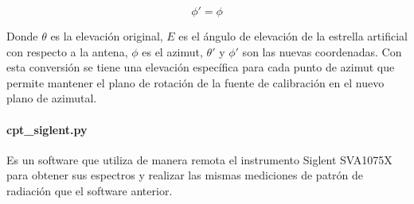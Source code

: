 \begin{equation}
    \phi' = \phi
\end{equation}

Donde $\theta$ es la elevación original, $E$ es el ángulo de elevación de la estrella artificial con respecto a la antena, $\phi$ es el azimut, $\theta'$ y $\phi'$ son las nuevas coordenadas. Con esta conversión se tiene una elevación específica para cada punto de azimut que permite mantener el plano de rotación de la fuente de calibración en el nuevo plano de azimutal.\\

\paragraph{cpt\_siglent.py} Es un software que utiliza de manera remota el instrumento Siglent SVA1075X para obtener sus espectros y realizar las mismas mediciones de patrón de radiación que el software anterior.\\